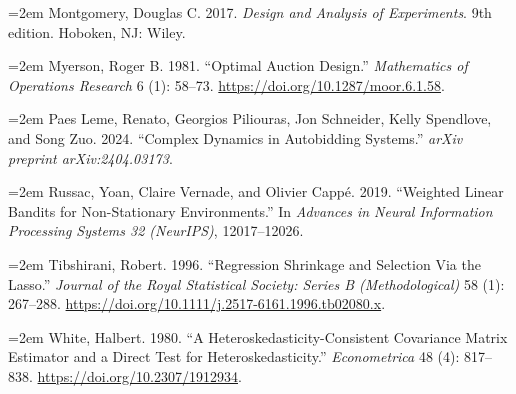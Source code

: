 \hangindent=2em Montgomery, Douglas C. 2017. \textit{Design and Analysis of Experiments}. 9th edition. Hoboken, NJ: Wiley.

\hangindent=2em Myerson, Roger B. 1981. ``Optimal Auction Design.'' \textit{Mathematics of Operations Research} 6 (1): 58--73. \url{https://doi.org/10.1287/moor.6.1.58}.

\hangindent=2em Paes Leme, Renato, Georgios Piliouras, Jon Schneider, Kelly Spendlove, and Song Zuo. 2024. ``Complex Dynamics in Autobidding Systems.'' \textit{arXiv preprint arXiv:2404.03173}.

\hangindent=2em Russac, Yoan, Claire Vernade, and Olivier Capp\'{e}. 2019. ``Weighted Linear Bandits for Non-Stationary Environments.'' In \textit{Advances in Neural Information Processing Systems 32 (NeurIPS)}, 12017--12026.

\hangindent=2em Tibshirani, Robert. 1996. ``Regression Shrinkage and Selection Via the Lasso.'' \textit{Journal of the Royal Statistical Society: Series B (Methodological)} 58 (1): 267--288. \url{https://doi.org/10.1111/j.2517-6161.1996.tb02080.x}.

\hangindent=2em White, Halbert. 1980. ``A Heteroskedasticity-Consistent Covariance Matrix Estimator and a Direct Test for Heteroskedasticity.'' \textit{Econometrica} 48 (4): 817--838. \url{https://doi.org/10.2307/1912934}.

\endgroup
